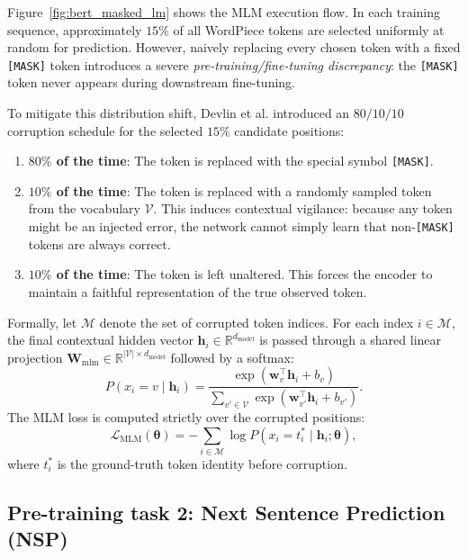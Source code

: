\documentclass[../../main.tex]{subfiles}
\begin{document}
Figure~\ref{fig:bert_masked_lm} shows the MLM execution flow. In each training sequence, approximately $15\%$ of all WordPiece tokens are selected uniformly at random for prediction. However, naively replacing every chosen token with a fixed \texttt{[MASK]} token introduces a severe \emph{pre-training/fine-tuning discrepancy}: the \texttt{[MASK]} token never appears during downstream fine-tuning.

To mitigate this distribution shift, Devlin et al. introduced an $80/10/10$ corruption schedule for the selected $15\%$ candidate positions:
\begin{enumerate}
    \item \textbf{$80\%$ of the time}: The token is replaced with the special symbol \texttt{[MASK]}.
    \item \textbf{$10\%$ of the time}: The token is replaced with a randomly sampled token from the vocabulary $\mathcal{V}$. This induces contextual vigilance: because any token might be an injected error, the network cannot simply learn that non-\texttt{[MASK]} tokens are always correct.
    \item \textbf{$10\%$ of the time}: The token is left unaltered. This forces the encoder to maintain a faithful representation of the true observed token.
\end{enumerate}

Formally, let $\mathcal{M}$ denote the set of corrupted token indices. For each index $i \in \mathcal{M}$, the final contextual hidden vector $\mathbf{h}_i \in \mathbb{R}^{d_{\text{model}}}$ is passed through a shared linear projection $\mathbf{W}_{\text{mlm}} \in \mathbb{R}^{|\mathcal{V}| \times d_{\text{model}}}$ followed by a softmax:
\begin{equation}
P(x_i = v \mid \mathbf{h}_i) = \frac{\exp(\mathbf{w}_v^\top \mathbf{h}_i + b_v)}{\sum_{v' \in \mathcal{V}} \exp(\mathbf{w}_{v'}^\top \mathbf{h}_i + b_{v'})}.
\label{eq:bert_mlm_prediction_prob}
\end{equation}
The MLM loss is computed strictly over the corrupted positions:
\begin{equation}
\mathcal{L}_{\text{MLM}}(\boldsymbol{\theta}) = -\sum_{i \in \mathcal{M}} \log P(x_i = t_i^* \mid \mathbf{h}_i; \boldsymbol{\theta}),
\label{eq:bert_mlm_cross_entropy_loss}
\end{equation}
where $t_i^*$ is the ground-truth token identity before corruption.


\subsection{Pre-training task 2: Next Sentence Prediction (NSP)}
\label{subsec:bert_nsp}
\end{document}
